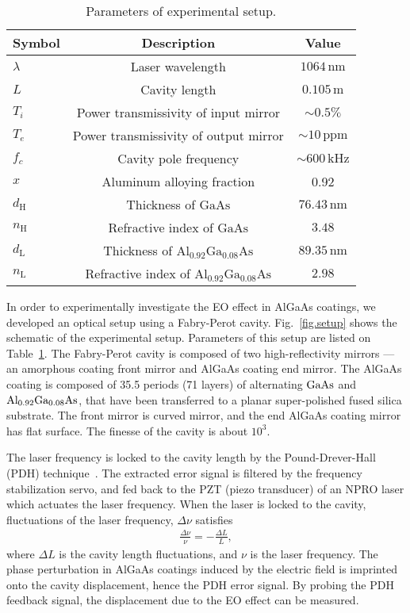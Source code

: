 \begin{table}[h!]
    \caption{Parameters of experimental setup.}\label{tab.param}
\centering 
\begin{tabular}{lcc}
    \hline \hline
    Symbol & Description & Value \\
    \hline
    $\lambda$ & Laser wavelength & $1064 \, \mathrm{nm}$ \\
    $L$ & Cavity length & $0.105\, \mathrm{m}$ \\
    $T_i$ & Power transmissivity of input mirror & $\sim0.5\%$ \\
    $T_e$ & Power transmissivity of output mirror & $\sim10\, \mathrm{ppm}$ \\
    $f_c$ & Cavity pole frequency & $\sim600\, \mathrm{kHz}$ \\
    $x$ & Aluminum alloying fraction & 0.92 \\
    $d_{\mathrm{H}}$ & Thickness of $\mathrm{GaAs}$ & $76.43\, \mathrm{nm}$ \\
    $n_{\mathrm{H}}$ & Refractive index of $\mathrm{GaAs}$ & $3.48$ \\
    $d_{\mathrm{L}}$ & Thickness of $\mathrm{Al_{0.92}Ga_{0.08}As}$ & $89.35\, \mathrm{nm}$ \\
    $n_{\mathrm{L}}$ & Refractive index of $\mathrm{Al_{0.92}Ga_{0.08}As}$ & $2.98$ \\
    \hline \hline
\end{tabular}
\end{table}

In order to experimentally investigate the EO effect in AlGaAs coatings, we developed an optical setup using a Fabry-Perot cavity.
Fig.~\ref{fig.setup} shows the schematic of the experimental setup.
Parameters of this setup are listed on Table~\ref{tab.param}.
The Fabry-Perot cavity is composed of two high-reflectivity mirrors --- an amorphous coating front mirror and AlGaAs coating end mirror.
The AlGaAs coating is composed of 35.5 periods (71 layers) of alternating $\mathrm{GaAs}$ and $\mathrm{Al_{0.92}Ga_{0.08}As}$, that have been transferred to a planar super-polished fused silica substrate.
The front mirror is curved mirror, and the end AlGaAs coating mirror has flat surface.
The finesse of the cavity is about $10^3$.

The laser frequency is locked to the cavity length by the Pound-Drever-Hall (PDH) technique~\cite{PDH}.
The extracted error signal is filtered by the frequency stabilization servo, and fed back to the PZT (piezo transducer) of an NPRO laser which actuates the laser frequency.
When the laser is locked to the cavity, fluctuations of the laser frequency, $\Delta\nu$ satisfies
\begin{align}
    \frac{\Delta \nu}{\nu} = -\frac{\Delta L}{L},
    \label{eq.cavity_fluctuation}
\end{align}
where $\Delta L$ is the cavity length fluctuations, and $\nu$ is the laser frequency.
The phase perturbation in AlGaAs coatings induced by the electric field is imprinted onto the cavity displacement, hence the PDH error signal.
By probing the PDH feedback signal, the displacement due to the EO effect can be measured.


